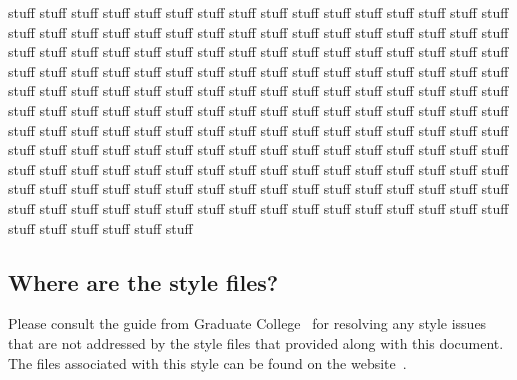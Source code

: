 \documentclass[proposal]{bsu-ms}
\begin{document}
stuff stuff stuff stuff stuff stuff stuff stuff stuff stuff stuff stuff stuff
stuff stuff stuff stuff stuff stuff stuff stuff stuff stuff stuff stuff stuff
stuff stuff stuff stuff stuff stuff stuff stuff stuff stuff stuff stuff stuff
stuff stuff stuff stuff stuff stuff stuff stuff stuff stuff stuff stuff stuff
stuff stuff stuff stuff stuff stuff stuff stuff stuff stuff stuff stuff stuff
stuff stuff stuff stuff stuff stuff stuff stuff stuff stuff stuff stuff stuff
stuff stuff stuff stuff stuff stuff stuff stuff stuff stuff stuff stuff stuff
stuff stuff stuff stuff stuff stuff stuff stuff stuff stuff stuff stuff stuff
stuff stuff stuff stuff stuff stuff stuff stuff stuff stuff stuff stuff stuff
stuff stuff stuff stuff stuff stuff stuff stuff stuff stuff stuff stuff stuff
stuff stuff stuff stuff stuff stuff stuff stuff stuff stuff stuff stuff stuff
stuff stuff stuff stuff stuff stuff stuff stuff stuff stuff stuff stuff stuff
stuff stuff stuff stuff stuff stuff stuff stuff stuff stuff stuff stuff stuff
stuff stuff stuff stuff stuff stuff stuff stuff stuff stuff stuff stuff stuff



\subsection{Where are the style files?}



Please consult the guide from Graduate College~\cite{guide} for resolving any
style issues that are not addressed by the style files that provided along
with this document. The files associated with this style can be found on the
website~\cite{amit}.

\end{document}
